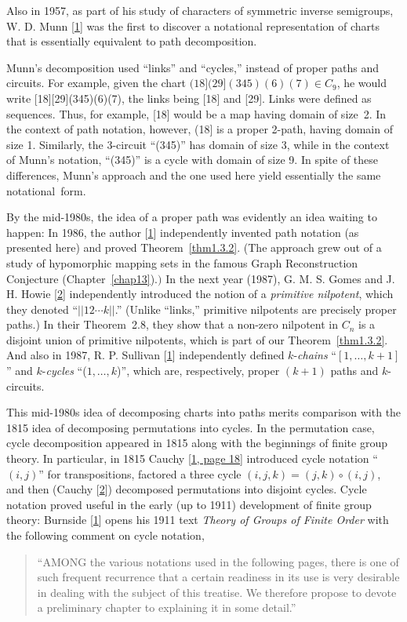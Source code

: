\documentclass{surv-l}
\numberwithin{equation}{section}
\numberwithin{table}{section}
\numberwithin{figure}{section}
\theoremstyle{definition}
\begin{document}
Also in 1957, as part of his study of characters of symmetric
inverse semigroups, W. D. Munn
[\hyperlink{bib54}{1}] was the first to discover a
notational representation of charts that is essentially equivalent
to path decomposition.

Munn's decomposition used ``links'' and ``cycles,'' instead of
proper paths and circuits. For example, given the chart $(18](29](345)(6)(7) \in C_{9}$,
he would write [18][29](345)(6)(7), the
links being [18] and [29]. Links were defined as sequences. Thus,
for example, [18] would be a map having domain of size~2. In the
context of path notation, however, (18] is a proper 2-path, having
domain of size 1. Similarly, the 3-circuit ``(345)''  has domain
of size 3, while in the context of Munn's notation, ``(345)'' is a
cycle with domain of size 9. In spite of these differences, Munn's
approach and the one used here yield essentially the same
notational~form.

By the mid-1980s, the idea of a proper path was evidently an idea
waiting to happen: In 1986, the author
[\hyperlink{bib37}{1}] independently invented path
notation (as presented here) and proved Theorem~\ref{thm1.3.2}.
(The approach grew out of a study of hypomorphic mapping sets in
the famous Graph Reconstruction Conjecture
(Chapter~\ref{chap13}).$)$ In the next year (1987), G. M. S.
Gomes and J. H. Howie
[\hyperlink{bib22a}{2}] independently introduced the
notion of a \emph{primitive nilpotent}, which they denoted
``$||12\cdots k||$.'' (Unlike ``links,'' primitive nilpotents are
precisely proper paths.) In their Theorem~2.8, they show that a
non-zero nilpotent in $C_{n}$ is a disjoint union of primitive
nilpotents, which is part of our Theorem~\ref{thm1.3.2}. And also
in 1987, R. P. Sullivan
[\hyperlink{bib72}{1}] independently defined
$k$-\emph{chains} ``$[1,\ldots, k+1]$'' and $k$-\emph{cycles}
``($1,\ldots,k$)'', which are, respectively, proper $(k+1)$ paths
and $k$-circuits.

This mid-1980s idea of decomposing charts into paths merits
comparison with the 1815 idea of decomposing permutations into
cycles. In the permutation case, cycle decomposition appeared in
1815 along with the beginnings of finite group theory. In
particular, in 1815 Cauchy [\hyperlink{bib7}{1, page 18}]
introduced cycle notation ``$(i,j)$'' for transpositions, factored
a three cycle $(i,j,k)=(j,k)\circ (i,j)$, and then (Cauchy
[\hyperlink{bib7a}{2}]) decomposed permutations into
disjoint cycles. Cycle notation proved useful in the early (up to
1911) development of finite group theory: Burnside [\hyperlink{bib6}{1}] opens his 1911 text
\emph{Theory of Groups of Finite Order} with the following comment
on cycle notation,
\begin{quote}
``AMONG the various notations used in the following pages, there
is one of such frequent recurrence that a certain readiness in its
use is very desirable in dealing with the subject of this
treatise. We therefore propose to devote a preliminary chapter to
explaining it in some detail.''
\end{quote}
\end{document}
